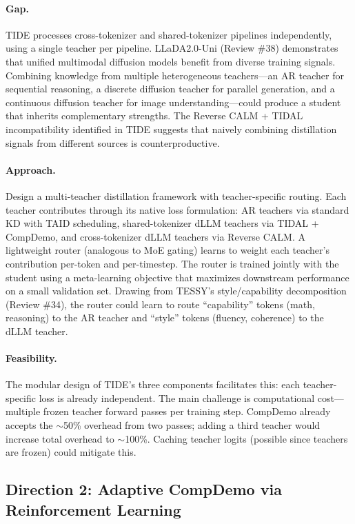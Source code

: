 \documentclass[11pt]{article}
\begin{document}
\paragraph{Gap.}
TIDE processes cross-tokenizer and shared-tokenizer pipelines independently, using a single teacher per pipeline. LLaDA2.0-Uni (Review \#38) demonstrates that unified multimodal diffusion models benefit from diverse training signals. Combining knowledge from multiple heterogeneous teachers---an AR teacher for sequential reasoning, a discrete diffusion teacher for parallel generation, and a continuous diffusion teacher for image understanding---could produce a student that inherits complementary strengths. The Reverse CALM + TIDAL incompatibility identified in TIDE suggests that naively combining distillation signals from different sources is counterproductive.

\paragraph{Approach.}
Design a multi-teacher distillation framework with teacher-specific routing. Each teacher contributes through its native loss formulation: AR teachers via standard KD with TAID scheduling, shared-tokenizer dLLM teachers via TIDAL + CompDemo, and cross-tokenizer dLLM teachers via Reverse CALM. A lightweight router (analogous to MoE gating) learns to weight each teacher's contribution per-token and per-timestep. The router is trained jointly with the student using a meta-learning objective that maximizes downstream performance on a small validation set. Drawing from TESSY's style/capability decomposition (Review \#34), the router could learn to route ``capability'' tokens (math, reasoning) to the AR teacher and ``style'' tokens (fluency, coherence) to the dLLM teacher.

\paragraph{Feasibility.}
The modular design of TIDE's three components facilitates this: each teacher-specific loss is already independent. The main challenge is computational cost---multiple frozen teacher forward passes per training step. CompDemo already accepts the $\sim$50\% overhead from two passes; adding a third teacher would increase total overhead to $\sim$100\%. Caching teacher logits (possible since teachers are frozen) could mitigate this.

\subsection{Direction 2: Adaptive CompDemo via Reinforcement Learning}
\end{document}
